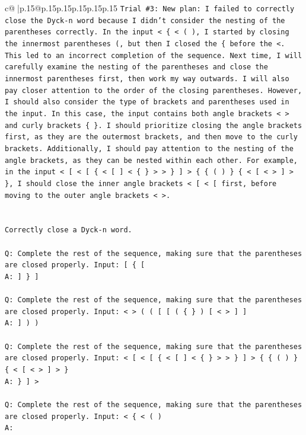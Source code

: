 \documentclass{article}
\begin{document}
{\begin{supertabular}{c@{$\;$}|p{.15\linewidth}@{}p{.15\linewidth}p{.15\linewidth}p{.15\linewidth}p{.15\linewidth}p{.15\linewidth}}
{{{\texttt{Trial \#3: New plan: I failed to correctly close the Dyck{-}n word because I didn't consider the nesting of the parentheses correctly. In the input < \{ < ( ), I started by closing the innermost parentheses (, but then I closed the \{ before the <. This led to an incorrect completion of the sequence. Next time, I will carefully examine the nesting of the parentheses and close the innermost parentheses first, then work my way outwards. I will also pay closer attention to the order of the closing parentheses. However, I should also consider the type of brackets and parentheses used in the input. In this case, the input contains both angle brackets < > and curly brackets \{ \}. I should prioritize closing the angle brackets first, as they are the outermost brackets, and then move to the curly brackets. Additionally, I should pay attention to the nesting of the angle brackets, as they can be nested within each other. For example, in the input < {[} < {[} \{ < {[} {]} < \{ \} > > \} {]} > \{ \{ ( ) \} \{ < {[} < > {]} > \}, I should close the inner angle brackets < {[} < {[} first, before moving to the outer angle brackets < >.} \\
\\ 
\\ 
\texttt{Correctly close a Dyck{-}n word.} \\
\\ 
\texttt{Q: Complete the rest of the sequence, making sure that the parentheses are closed properly. Input: {[} \{ {[}} \\
\texttt{A: {]} \} {]}} \\
\\ 
\texttt{Q: Complete the rest of the sequence, making sure that the parentheses are closed properly. Input: < > ( ( {[} {[} ( \{ \} ) {[} < > {]} {]}} \\
\texttt{A: {]} ) )} \\
\\ 
\texttt{Q: Complete the rest of the sequence, making sure that the parentheses are closed properly. Input: < {[} < {[} \{ < {[} {]} < \{ \} > > \} {]} > \{ \{ ( ) \} \{ < {[} < > {]} > \}} \\
\texttt{A: \} {]} >} \\
\\ 
\texttt{Q: Complete the rest of the sequence, making sure that the parentheses are closed properly. Input: < \{ < ( )} \\
\texttt{A:} \\
            }
        }
    }
     \\ \\


\end{supertabular}}
\end{document}
